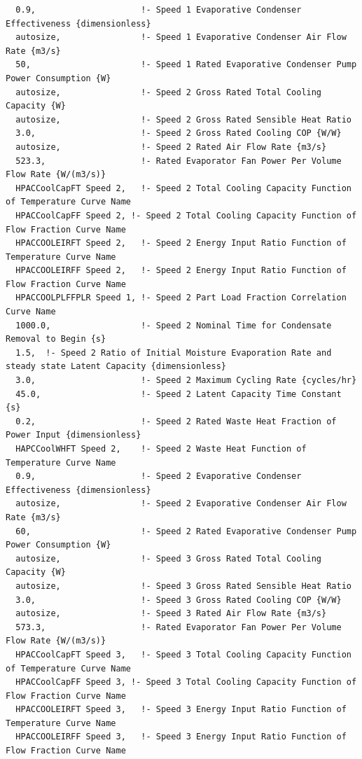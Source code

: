 \begin{lstlisting}
  0.9,                     !- Speed 1 Evaporative Condenser Effectiveness {dimensionless}
  autosize,                !- Speed 1 Evaporative Condenser Air Flow Rate {m3/s}
  50,                      !- Speed 1 Rated Evaporative Condenser Pump Power Consumption {W}
  autosize,                !- Speed 2 Gross Rated Total Cooling Capacity {W}
  autosize,                !- Speed 2 Gross Rated Sensible Heat Ratio
  3.0,                     !- Speed 2 Gross Rated Cooling COP {W/W}
  autosize,                !- Speed 2 Rated Air Flow Rate {m3/s}
  523.3,                   !- Rated Evaporator Fan Power Per Volume Flow Rate {W/(m3/s)}
  HPACCoolCapFT Speed 2,   !- Speed 2 Total Cooling Capacity Function of Temperature Curve Name
  HPACCoolCapFF Speed 2, !- Speed 2 Total Cooling Capacity Function of Flow Fraction Curve Name
  HPACCOOLEIRFT Speed 2,   !- Speed 2 Energy Input Ratio Function of Temperature Curve Name
  HPACCOOLEIRFF Speed 2,   !- Speed 2 Energy Input Ratio Function of Flow Fraction Curve Name
  HPACCOOLPLFFPLR Speed 1, !- Speed 2 Part Load Fraction Correlation Curve Name
  1000.0,                  !- Speed 2 Nominal Time for Condensate Removal to Begin {s}
  1.5,  !- Speed 2 Ratio of Initial Moisture Evaporation Rate and steady state Latent Capacity {dimensionless}
  3.0,                     !- Speed 2 Maximum Cycling Rate {cycles/hr}
  45.0,                    !- Speed 2 Latent Capacity Time Constant {s}
  0.2,                     !- Speed 2 Rated Waste Heat Fraction of Power Input {dimensionless}
  HAPCCoolWHFT Speed 2,    !- Speed 2 Waste Heat Function of Temperature Curve Name
  0.9,                     !- Speed 2 Evaporative Condenser Effectiveness {dimensionless}
  autosize,                !- Speed 2 Evaporative Condenser Air Flow Rate {m3/s}
  60,                      !- Speed 2 Rated Evaporative Condenser Pump Power Consumption {W}
  autosize,                !- Speed 3 Gross Rated Total Cooling Capacity {W}
  autosize,                !- Speed 3 Gross Rated Sensible Heat Ratio
  3.0,                     !- Speed 3 Gross Rated Cooling COP {W/W}
  autosize,                !- Speed 3 Rated Air Flow Rate {m3/s}
  573.3,                   !- Rated Evaporator Fan Power Per Volume Flow Rate {W/(m3/s)}
  HPACCoolCapFT Speed 3,   !- Speed 3 Total Cooling Capacity Function of Temperature Curve Name
  HPACCoolCapFF Speed 3, !- Speed 3 Total Cooling Capacity Function of Flow Fraction Curve Name
  HPACCOOLEIRFT Speed 3,   !- Speed 3 Energy Input Ratio Function of Temperature Curve Name
  HPACCOOLEIRFF Speed 3,   !- Speed 3 Energy Input Ratio Function of Flow Fraction Curve Name

\end{lstlisting}
